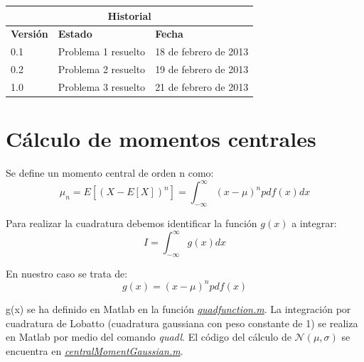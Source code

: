 \documentclass[a4paper,11pt]{article}
\begin{document}
\vspace{2cm}
\begin{center}
\begin{tabular}{|p{2.5cm}|p{3.5cm}|p{3.5cm}|}
\hline
\multicolumn{3}{|c|}{\textbf{Historial}}\\
\hline
\hline
\textbf{Versi\'on} & \textbf{Estado} & \textbf{Fecha}\\
\hline
0.1 & Problema 1 resuelto & 18 de febrero de 2013\\
\hline
0.2 & Problema 2 resuelto & 19 de febrero de 2013\\
\hline
1.0 & Problema 3 resuelto & 21 de febrero de 2013\\
\hline
\end{tabular}
\end{center}

\newpage
\mbox{}
\thispagestyle{empty}
\pagebreak

\setcounter{page}{1}
\pagebreak

\setcounter{tocdepth}{3}
\tableofcontents
\pagebreak
\listoftables
\listoffigures
\lstlistoflistings
\pagebreak

\setcounter{page}{1}

\pagebreak
\section{C\'alculo de momentos centrales}

Se define un momento central de orden n como:\\
\begin{equation*}
   \mu_n = E [(X- E[X])^n] = \int_{-\infty}^\infty (x - \mu)^n pdf(x)dx
\end{equation*}

Para realizar la cuadratura debemos identificar la funci\'on $g(x)$ a
integrar:\\
\begin{equation*}
   I = \int_{-\infty}^\infty g(x)dx
\end{equation*}

En nuestro caso se trata de:\\
\begin{equation*}
   g(x) = (x - \mu)^n pdf(x)
\end{equation*}

g(x) se ha definido en Matlab en la funci\'on
\hyperref[quadfunc]{\textit{quadfunction.m}}. La integraci\'on por cuadratura de
Lobatto (cuadratura gaussiana con peso constante de 1) se realiza en Matlab por
medio del comando \textit{quadl}. El c\'odigo del c\'alculo de
$\mathcal{N}(\mu, \sigma)$ se encuentra en
\hyperref[centralMomentQuad]{\textit{centralMomentGaussian.m}}.
\end{document}
